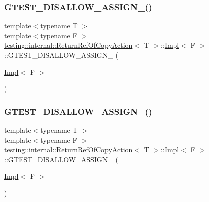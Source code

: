 \subsubsection{\texorpdfstring{GTEST\_DISALLOW\_ASSIGN\_()}{GTEST\_DISALLOW\_ASSIGN\_()}\hspace{0.1cm}{\footnotesize\ttfamily [2/3]}}
{\footnotesize\ttfamily template$<$typename T $>$ \\
template$<$typename F $>$ \\
\mbox{\hyperlink{classtesting_1_1internal_1_1_return_ref_of_copy_action}{testing\+::internal\+::\+Return\+Ref\+Of\+Copy\+Action}}$<$ T $>$\+::\mbox{\hyperlink{classtesting_1_1internal_1_1_return_ref_of_copy_action_1_1_impl}{Impl}}$<$ F $>$\+::G\+T\+E\+S\+T\+\_\+\+D\+I\+S\+A\+L\+L\+O\+W\+\_\+\+A\+S\+S\+I\+G\+N\+\_\+ (\begin{DoxyParamCaption}\item[{\mbox{\hyperlink{classtesting_1_1internal_1_1_return_ref_of_copy_action_1_1_impl}{Impl}}$<$ F $>$}]{ }\end{DoxyParamCaption})\hspace{0.3cm}{\ttfamily [private]}}

\mbox{\label{classtesting_1_1internal_1_1_return_ref_of_copy_action_1_1_impl_a380485fdbcb248ca267bf190202607c5}} 
\subsubsection{\texorpdfstring{GTEST\_DISALLOW\_ASSIGN\_()}{GTEST\_DISALLOW\_ASSIGN\_()}\hspace{0.1cm}{\footnotesize\ttfamily [3/3]}}
{\footnotesize\ttfamily template$<$typename T $>$ \\
template$<$typename F $>$ \\
\mbox{\hyperlink{classtesting_1_1internal_1_1_return_ref_of_copy_action}{testing\+::internal\+::\+Return\+Ref\+Of\+Copy\+Action}}$<$ T $>$\+::\mbox{\hyperlink{classtesting_1_1internal_1_1_return_ref_of_copy_action_1_1_impl}{Impl}}$<$ F $>$\+::G\+T\+E\+S\+T\+\_\+\+D\+I\+S\+A\+L\+L\+O\+W\+\_\+\+A\+S\+S\+I\+G\+N\+\_\+ (\begin{DoxyParamCaption}\item[{\mbox{\hyperlink{classtesting_1_1internal_1_1_return_ref_of_copy_action_1_1_impl}{Impl}}$<$ F $>$}]{ }\end{DoxyParamCaption})\hspace{0.3cm}{\ttfamily [private]}}

